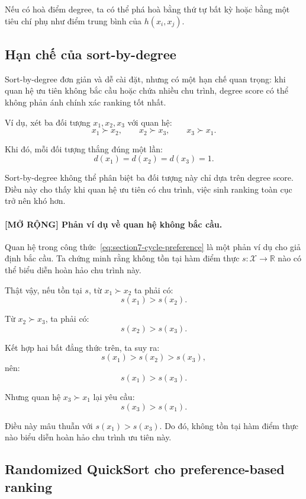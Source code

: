 Nếu có hoà điểm degree, ta có thể phá hoà bằng thứ tự bất kỳ hoặc bằng một tiêu chí phụ như điểm trung bình của \(h(x_i,x_j)\).

\subsection{Hạn chế của sort-by-degree}

Sort-by-degree đơn giản và dễ cài đặt, nhưng có một hạn chế quan trọng: khi quan hệ ưu tiên không bắc cầu hoặc chứa nhiều chu trình, degree score có thể không phản ánh chính xác ranking tốt nhất.

Ví dụ, xét ba đối tượng \(x_1,x_2,x_3\) với quan hệ:
\begin{equation}
    x_1\succ x_2,
    \qquad
    x_2\succ x_3,
    \qquad
    x_3\succ x_1.
    \label{eq:section7-cycle-preference}
\end{equation}

Khi đó, mỗi đối tượng thắng đúng một lần:
\[
    d(x_1)=d(x_2)=d(x_3)=1.
\]

Sort-by-degree không thể phân biệt ba đối tượng này chỉ dựa trên degree score. Điều này cho thấy khi quan hệ ưu tiên có chu trình, việc sinh ranking toàn cục trở nên khó hơn.

\paragraph{[MỞ RỘNG] Phản ví dụ về quan hệ không bắc cầu.}

Quan hệ trong công thức~\eqref{eq:section7-cycle-preference} là một phản ví dụ cho giả định bắc cầu. Ta chứng minh rằng không tồn tại hàm điểm thực \(s:\mathcal{X}\rightarrow\mathbb{R}\) nào có thể biểu diễn hoàn hảo chu trình này.

Thật vậy, nếu tồn tại \(s\), từ \(x_1\succ x_2\) ta phải có:
\[
    s(x_1)>s(x_2).
\]

Từ \(x_2\succ x_3\), ta phải có:
\[
    s(x_2)>s(x_3).
\]

Kết hợp hai bất đẳng thức trên, ta suy ra:
\[
    s(x_1)>s(x_2)>s(x_3),
\]
nên:
\[
    s(x_1)>s(x_3).
\]

Nhưng quan hệ \(x_3\succ x_1\) lại yêu cầu:
\[
    s(x_3)>s(x_1).
\]

Điều này mâu thuẫn với \(s(x_1)>s(x_3)\). Do đó, không tồn tại hàm điểm thực nào biểu diễn hoàn hảo chu trình ưu tiên này.

\subsection{Randomized QuickSort cho preference-based ranking}

